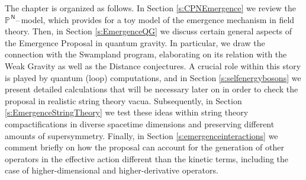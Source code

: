 	


The chapter is organized as follows. In Section \ref{s:CPNEmergence} we review the $\mathbb{P}^{\,\mathsf{N}}$--\,model, which provides for a toy model of the emergence mechanism in field theory. Then, in Section \ref{s:EmergenceQG} we discuss certain general aspects of the Emergence Proposal in quantum gravity. In particular, we draw the connection with the Swampland program, elaborating on its relation with the Weak Gravity as well as the Distance conjectures. A crucial role within this story is played by quantum (loop) computations, and in Section \ref{s:selfenergybosons} we present detailed calculations that will be necessary later on in order to check the proposal in realistic string theory vacua. Subsequently, in Section \ref{s:EmergenceStringTheory} we test these ideas within string theory compactifications in diverse spacetime dimensions and preserving different amounts of supersymmetry. Finally, in Section \ref{s:emergenceinteractions} we comment briefly on how the proposal can account for the generation of other operators in the effective action different than the kinetic terms, including the case of higher-dimensional and higher-derivative operators. 

